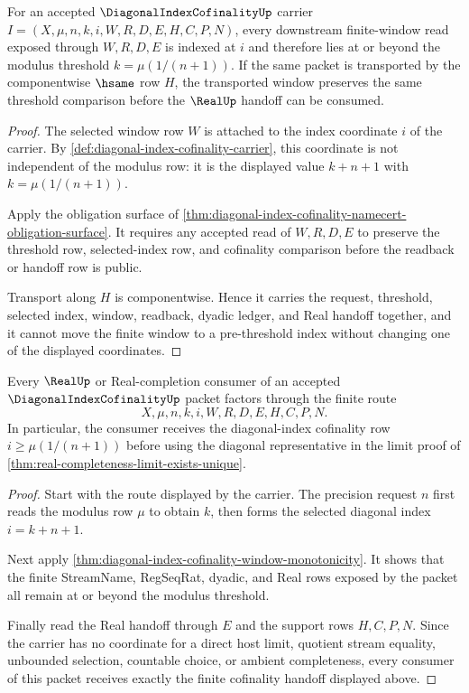 \begin{theorem}
\label{thm:diagonal-index-cofinality-window-monotonicity}
For an accepted $\DiagonalIndexCofinalityUp$ carrier $I=(X,\mu,n,k,i,W,R,D,E,H,C,P,N)$, every downstream finite-window read exposed through $W,R,D,E$ is indexed at $i$ and therefore lies at or beyond the modulus threshold $k=\mu(1/(n+1))$. If the same packet is transported by the componentwise $\hsame$ row $H$, the transported window preserves the same threshold comparison before the $\RealUp$ handoff can be consumed.
\end{theorem}
\begin{proof}
The selected window row $W$ is attached to the index coordinate $i$ of the carrier. By \autoref{def:diagonal-index-cofinality-carrier}, this coordinate is not independent of the modulus row: it is the displayed value $k+n+1$ with $k=\mu(1/(n+1))$.

Apply the obligation surface of \autoref{thm:diagonal-index-cofinality-namecert-obligation-surface}. It requires any accepted read of $W,R,D,E$ to preserve the threshold row, selected-index row, and cofinality comparison before the readback or handoff row is public.

Transport along $H$ is componentwise. Hence it carries the request, threshold, selected index, window, readback, dyadic ledger, and Real handoff together, and it cannot move the finite window to a pre-threshold index without changing one of the displayed coordinates.
\end{proof}

\begin{theorem}
\label{thm:diagonal-index-cofinality-real-completion-handoff}
Every $\RealUp$ or Real-completion consumer of an accepted $\DiagonalIndexCofinalityUp$ packet factors through the finite route
$$
X,\mu,n,k,i,W,R,D,E,H,C,P,N.
$$
In particular, the consumer receives the diagonal-index cofinality row $i\geq \mu(1/(n+1))$ before using the diagonal representative in the limit proof of \autoref{thm:real-completeness-limit-exists-unique}.
\end{theorem}
\begin{proof}
Start with the route displayed by the carrier. The precision request $n$ first reads the modulus row $\mu$ to obtain $k$, then forms the selected diagonal index $i=k+n+1$.

Next apply \autoref{thm:diagonal-index-cofinality-window-monotonicity}. It shows that the finite StreamName, RegSeqRat, dyadic, and Real rows exposed by the packet all remain at or beyond the modulus threshold.

Finally read the Real handoff through $E$ and the support rows $H,C,P,N$. Since the carrier has no coordinate for a direct host limit, quotient stream equality, unbounded selection, countable choice, or ambient completeness, every consumer of this packet receives exactly the finite cofinality handoff displayed above.
\end{proof}


